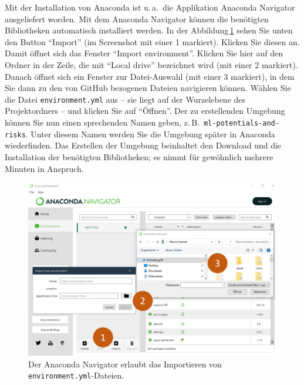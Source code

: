 \documentclass[nobib]{tufte-handout}
\begin{document}
Mit der Installation von Anaconda ist u.\,a.\ die Applikation Anaconda Navigator ausgeliefert worden.
Mit dem Anaconda Navigator können die benötigten Bibliotheken automatisch installiert werden.
In der Abbildung\,\ref{fig:anaconda-navigator} sehen Sie unten den Button \enquote{Import}
(im Screenshot mit einer 1 markiert).
Klicken Sie diesen an.
Damit öffnet sich das Fenster \enquote{Import environment}.
Klicken Sie hier auf den Ordner in der Zeile, die mit 
\enquote{Local drive}
bezeichnet wird (mit einer 2 markiert).
Danach öffnet sich ein Fenster zur Datei-Auswahl
(mit einer 3 markiert),
in dem Sie dann zu den von GitHub bezogenen Dateien navigieren können.
Wählen Sie die Datei \texttt{environment.yml} aus
-- sie liegt auf der Wurzelebene des Projektordners --
und klicken Sie auf \enquote{Öffnen}.
Der zu erstellenden Umgebung können Sie nun einen sprechenden Namen geben, z.\,B.\ \texttt{ml-potentials-and-risks}.
Unter diesem Namen werden Sie die Umgebung später in Anaconda wiederfinden.
Das Erstellen der Umgebung beinhaltet den Download und die Installation der benötigten Bibliotheken; es nimmt für gewöhnlich mehrere Minuten in Anspruch.

\begin{figure}[h]
  \includegraphics{anaconda-navigator-import-new-environment--mit-reihenfolge}
  \caption{Der Anaconda Navigator erlaubt das Importieren von \texttt{environment.yml}-Dateien.}%
\label{fig:anaconda-navigator}
\end{figure}
\end{document}
